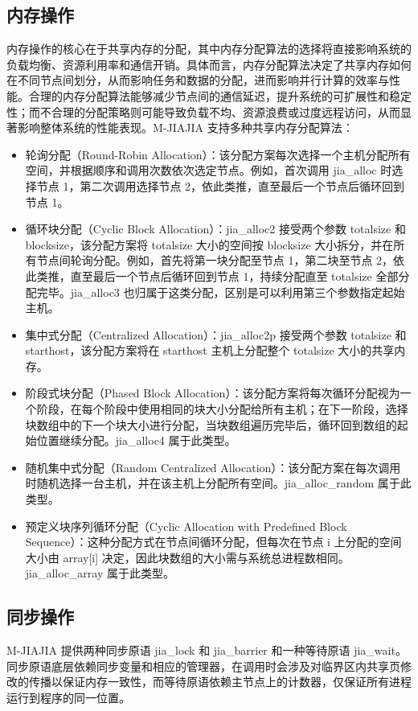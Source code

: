 {    \subsection{内存操作}
    内存操作的核心在于共享内存的分配，其中内存分配算法的选择将直接影响系统的负载均衡、资源利用率和通信开销。具体而言，内存分配算法决定了共享内存如何在不同节点间划分，从而影响任务和数据的分配，进而影响并行计算的效率与性能。合理的内存分配算法能够减少节点间的通信延迟，提升系统的可扩展性和稳定性；而不合理的分配策略则可能导致负载不均、资源浪费或过度远程访问，从而显著影响整体系统的性能表现。M-JIAJIA 支持多种共享内存分配算法：
    \begin{itemize}
        \item 轮询分配（Round-Robin Allocation）：该分配方案每次选择一个主机分配所有空间，并根据顺序和调用次数依次选定节点。例如，首次调用 jia\_alloc 时选择节点 1，第二次调用选择节点 2，依此类推，直至最后一个节点后循环回到节点 1。
        \item 循环块分配（Cyclic Block Allocation）：jia\_alloc2 接受两个参数 totalsize 和 blocksize，该分配方案将 totalsize 大小的空间按 blocksize 大小拆分，并在所有节点间轮询分配。例如，首先将第一块分配至节点 1，第二块至节点 2，依此类推，直至最后一个节点后循环回到节点 1，持续分配直至 totalsize 全部分配完毕。jia\_alloc3 也归属于这类分配，区别是可以利用第三个参数指定起始主机。
        \item 集中式分配（Centralized Allocation）：jia\_alloc2p 接受两个参数 totalsize 和 starthost，该分配方案将在 starthost 主机上分配整个 totalsize 大小的共享内存。
        \item 阶段式块分配（Phased Block Allocation）：该分配方案将每次循环分配视为一个阶段，在每个阶段中使用相同的块大小分配给所有主机；在下一阶段，选择块数组中的下一个块大小进行分配，当块数组遍历完毕后，循环回到数组的起始位置继续分配。jia\_alloc4 属于此类型。
        \item 随机集中式分配（Random Centralized Allocation）：该分配方案在每次调用时随机选择一台主机，并在该主机上分配所有空间。jia\_alloc\_random 属于此类型。
        \item 预定义块序列循环分配（Cyclic Allocation with Predefined Block Sequence）：这种分配方式在节点间循环分配，但每次在节点 i 上分配的空间大小由 array[i] 决定，因此块数组的大小需与系统总进程数相同。jia\_alloc\_array 属于此类型。
    \end{itemize}
    \subsection{同步操作}
    M-JIAJIA 提供两种同步原语 jia\_lock 和 jia\_barrier 和一种等待原语 jia\_wait。同步原语底层依赖同步变量和相应的管理器，在调用时会涉及对临界区内共享页修改的传播以保证内存一致性，而等待原语依赖主节点上的计数器，仅保证所有进程运行到程序的同一位置。

}
